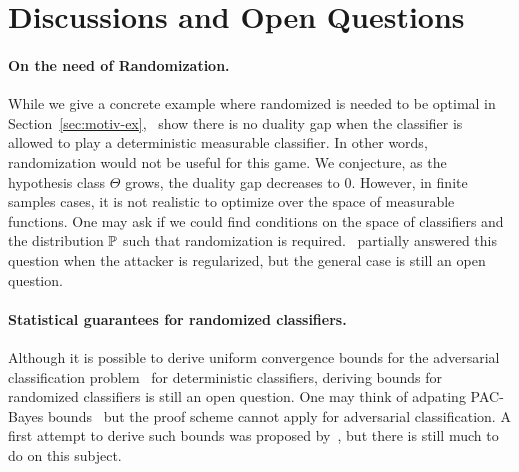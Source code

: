 \section{Discussions and Open Questions}


\paragraph{On the need of Randomization.} While we give a concrete example where randomized is needed to be optimal in Section~\ref{sec:motiv-ex},~\citep{pydi2021many} show there is no duality gap when the classifier is allowed to play a deterministic measurable classifier. In other words, randomization would not be useful for this game. We conjecture, as the hypothesis class $\Theta$ grows, the duality gap decreases to $0$. However, in finite samples cases, it is not realistic to optimize over the space of measurable functions. One may ask if we could find conditions on the space of classifiers and the distribution $\mathbb{P}$ such that randomization is required.~\citet{pinot2020randomization} partially answered this question when the attacker is regularized, but the general case is still an open question.

\paragraph{Statistical guarantees for randomized classifiers.} Although it is possible to derive uniform convergence bounds for the adversarial classification problem~\citep{yin2019rademacher,awasthi2020adversarial} for deterministic classifiers, deriving bounds for randomized classifiers is still an open question. One may think of adpating PAC-Bayes bounds~\citep{guedj2019primer} but the proof scheme cannot apply for adversarial classification. A first attempt to derive such bounds was proposed by~\citet{viallard2021pac}, but there is still much to do on this subject.


